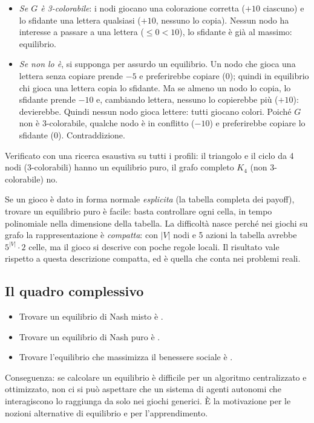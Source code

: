 \begin{extra}
\begin{itemize}
  \item \emph{Se $G$ è 3-colorabile}: i nodi giocano una colorazione corretta ($+10$
        ciascuno) e lo sfidante una lettera qualsiasi ($+10$, nessuno lo copia). Nessun
        nodo ha interesse a passare a una lettera ($\le 0 < 10$), lo sfidante è già al
        massimo: equilibrio.
  \item \emph{Se non lo è}, si supponga per assurdo un equilibrio. Un nodo che gioca una
        lettera senza copiare prende $-5$ e preferirebbe copiare ($0$); quindi in
        equilibrio chi gioca una lettera copia lo sfidante. Ma se almeno un nodo lo copia,
        lo sfidante prende $-10$ e, cambiando lettera, nessuno lo copierebbe più ($+10$):
        devierebbe. Quindi nessun nodo gioca lettere: tutti giocano colori. Poiché $G$ non
        è 3-colorabile, qualche nodo è in conflitto ($-10$) e preferirebbe copiare lo
        sfidante ($0$). Contraddizione.
\end{itemize}
Verificato con una ricerca esaustiva su tutti i profili: il triangolo e il ciclo da 4 nodi
(3-colorabili) hanno un equilibrio puro, il grafo completo $K_4$ (non 3-colorabile) no.
\end{extra}

\begin{attenzione}
Se un gioco è dato in forma normale \emph{esplicita} (la tabella completa dei payoff),
trovare un equilibrio puro è facile: basta controllare ogni cella, in tempo polinomiale
nella dimensione della tabella. La difficoltà nasce perché nei giochi su grafo la
rappresentazione è \emph{compatta}: con $|V|$ nodi e 5 azioni la tabella avrebbe
$5^{|V|}\cdot 2$ celle, ma il gioco si descrive con poche regole locali. Il risultato
vale rispetto a questa descrizione compatta, ed è quella che conta nei problemi reali.
\end{attenzione}

\subsection{Il quadro complessivo}

\begin{itemize}
  \item Trovare un equilibrio di Nash misto è .
  \item Trovare un equilibrio di Nash puro è .
  \item Trovare l'equilibrio che massimizza il benessere sociale è .
\end{itemize}
Conseguenza: se calcolare un equilibrio è difficile per un algoritmo centralizzato e
ottimizzato, non ci si può aspettare che un sistema di agenti autonomi che interagiscono
lo raggiunga da solo nei giochi generici. È la motivazione per le nozioni alternative di
equilibrio e per l'apprendimento.

